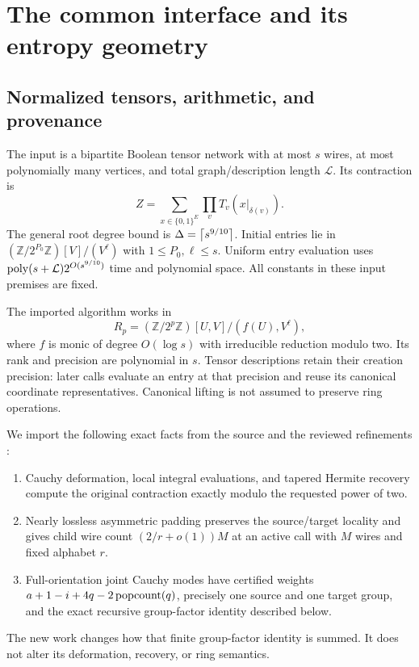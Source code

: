 \section{The common interface and its entropy geometry}
\label{sec:interface}

\subsection{Normalized tensors, arithmetic, and provenance}

The input is a bipartite Boolean tensor network with at most $s$ wires,
at most polynomially many vertices, and total graph/description length
$\mathcal L$. Its contraction is
\[
 Z=\sum_{x\in\{0,1\}^{E}}\prod_v T_v(x|_{\delta(v)}).
\]
The general root degree bound is $\Delta=\left\lceil s^{9/10}\right\rceil$.
Initial entries lie in
$ (\mathbb Z/2^{P_0}\mathbb Z)[V]/(V^\ell)$ with
$1\le P_0,\ell\le s$.
Uniform entry evaluation uses
$\operatorname{poly}(s+\mathcal L)2^{O(s^{9/10})}$ time and polynomial space.
All constants in these input premises are fixed.

The imported algorithm works in
\[
 R_p=(\mathbb Z/2^p\mathbb Z)[U,V]/(f(U),V^\ell),
\]
where $f$ is monic of degree $O(\log s)$ with irreducible reduction
modulo two. Its rank and precision are polynomial in $s$. Tensor
descriptions retain their creation precision: later calls evaluate an
entry at that precision and reuse its canonical coordinate representatives.
Canonical lifting is not assumed to preserve ring operations.

We import the following exact facts from the source and the reviewed
refinements \cite{source,asymmetric,joint,adaptive,tree}:

\begin{enumerate}
\item Cauchy deformation, local integral evaluations, and tapered Hermite
recovery compute the original contraction exactly modulo the requested
power of two.
\item Nearly lossless asymmetric padding preserves the source/target
locality and gives child wire count
$(2/r+o(1))M$ at an active call with $M$ wires and fixed alphabet $r$.
\item Full-orientation joint Cauchy modes have certified weights
$a+1-i+4q-2\operatorname{popcount}(q)$, precisely one source and one target group,
and the exact recursive group-factor identity described below.
\end{enumerate}

The new work changes how that finite group-factor identity is summed.
It does not alter its deformation, recovery, or ring semantics.

